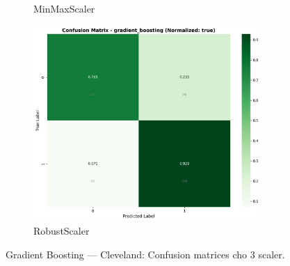 \begin{figure}[H]
\begin{subfigure}[b]{0.31\textwidth}
\caption{MinMaxScaler}\label{fig:gb_clev_cm_minmax}
\end{subfigure}\hfill
\begin{subfigure}[b]{0.31\textwidth}\centering
\includegraphics[width=0.95\textwidth]{Result/cleveland_dataset/confusion_matrices/gradient_boosting_numeric_dataset_RobustScaler.png}
\caption{RobustScaler}\label{fig:gb_clev_cm_robust}
\end{subfigure}
\caption{Gradient Boosting — Cleveland: Confusion matrices cho 3 scaler.}
\label{fig:gb_clev_confusions}
\end{figure}

